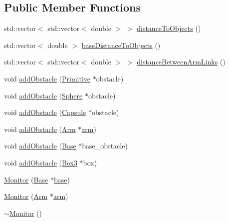 \subsection*{Public Member Functions}
\begin{DoxyCompactItemize}
\item 
std\+::vector$<$ std\+::vector$<$ double $>$ $>$ \hyperlink{class_monitor_a1801675787693435342ae799975b1120}{distance\+To\+Objects} ()
\item 
std\+::vector$<$ double $>$ \hyperlink{class_monitor_a1e4ef4f45f75dcc38d6283644a4bfdbe}{base\+Distance\+To\+Objects} ()
\item 
std\+::vector$<$ std\+::vector$<$ double $>$ $>$ \hyperlink{class_monitor_afe72152adc0d2d2faf8fb01563417033}{distance\+Between\+Arm\+Links} ()
\item 
void \hyperlink{class_monitor_a8c448bcff703af93489cc4f0847d4245}{add\+Obstacle} (\hyperlink{class_primitive}{Primitive} $\ast$obstacle)
\item 
void \hyperlink{class_monitor_af5979d8f05c2d945ddc055e329fad5d2}{add\+Obstacle} (\hyperlink{class_sphere}{Sphere} $\ast$obstacle)
\item 
void \hyperlink{class_monitor_a192497730489ebcd6a6580875cfbeee3}{add\+Obstacle} (\hyperlink{class_capsule}{Capsule} $\ast$obstacle)
\item 
void \hyperlink{class_monitor_a580dedf3090ffff7a452dbe32cc585f4}{add\+Obstacle} (\hyperlink{class_arm}{Arm} $\ast$\hyperlink{class_monitor_a8b75571f6224f999a3dc05cf9a83fa68}{arm})
\item 
void \hyperlink{class_monitor_ada0a962c56c54acb79a900dd9ef555b6}{add\+Obstacle} (\hyperlink{class_base}{Base} $\ast$base\+\_\+obstacle)
\item 
void \hyperlink{class_monitor_aa4f85c0ea9c00b1d633f69fa5ffef4cd}{add\+Obstacle} (\hyperlink{class_box3}{Box3} $\ast$box)
\item 
\hyperlink{class_monitor_a0761228d7a5ca8c0e272e5e3bec5bef8}{Monitor} (\hyperlink{class_base}{Base} $\ast$\hyperlink{class_monitor_a62aac32130c77d66f9cec4a06d5e75a7}{base})
\item 
\hyperlink{class_monitor_adda7d547e1226e159836356dd8af14bb}{Monitor} (\hyperlink{class_arm}{Arm} $\ast$\hyperlink{class_monitor_a8b75571f6224f999a3dc05cf9a83fa68}{arm})
\item 
\hyperlink{class_monitor_a64aba8195effc068092ddea5a71e8176}{$\sim$\+Monitor} ()
\end{DoxyCompactItemize}
